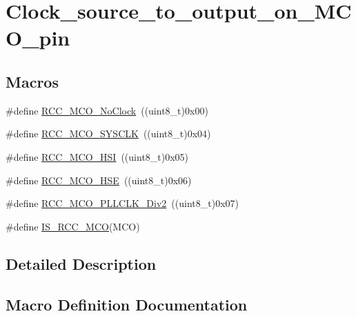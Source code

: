 \hypertarget{group___clock__source__to__output__on___m_c_o__pin}{}\section{Clock\+\_\+source\+\_\+to\+\_\+output\+\_\+on\+\_\+\+M\+C\+O\+\_\+pin}
\label{group___clock__source__to__output__on___m_c_o__pin}
\subsection*{Macros}
\begin{DoxyCompactItemize}
\item 
\#define \mbox{\hyperlink{group___clock__source__to__output__on___m_c_o__pin_ga1f39ff9f5606d3ad56e221d253be17d3}{R\+C\+C\+\_\+\+M\+C\+O\+\_\+\+No\+Clock}}~((uint8\+\_\+t)0x00)
\item 
\#define \mbox{\hyperlink{group___clock__source__to__output__on___m_c_o__pin_gab766ad89492ffe915de3438aaa96891b}{R\+C\+C\+\_\+\+M\+C\+O\+\_\+\+S\+Y\+S\+C\+LK}}~((uint8\+\_\+t)0x04)
\item 
\#define \mbox{\hyperlink{group___clock__source__to__output__on___m_c_o__pin_ga7206cdf03826781dc4fb1b094475d744}{R\+C\+C\+\_\+\+M\+C\+O\+\_\+\+H\+SI}}~((uint8\+\_\+t)0x05)
\item 
\#define \mbox{\hyperlink{group___clock__source__to__output__on___m_c_o__pin_ga8bd64bbefd2a725a0cfe2f2902dd9b0f}{R\+C\+C\+\_\+\+M\+C\+O\+\_\+\+H\+SE}}~((uint8\+\_\+t)0x06)
\item 
\#define \mbox{\hyperlink{group___clock__source__to__output__on___m_c_o__pin_ga1ce4233675bd7bdcb0220ed10ee7d8be}{R\+C\+C\+\_\+\+M\+C\+O\+\_\+\+P\+L\+L\+C\+L\+K\+\_\+\+Div2}}~((uint8\+\_\+t)0x07)
\item 
\#define \mbox{\hyperlink{group___clock__source__to__output__on___m_c_o__pin_ga0c2d4d6aa8881e01b8c06d8816284b73}{I\+S\+\_\+\+R\+C\+C\+\_\+\+M\+CO}}(M\+CO)
\end{DoxyCompactItemize}


\subsection{Detailed Description}


\subsection{Macro Definition Documentation}
\mbox{\label{group___clock__source__to__output__on___m_c_o__pin_ga0c2d4d6aa8881e01b8c06d8816284b73}} 
